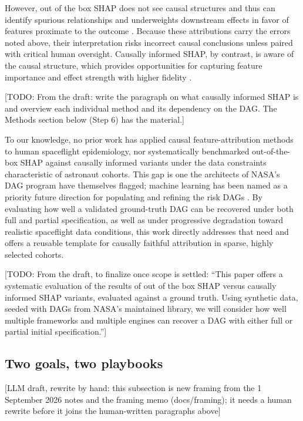 \documentclass[11pt]{article}
\newcommand{\todo}[1]{\textcolor{red!70!black}{[TODO: #1]}}
\newcommand{\draftnote}[1]{\textcolor{blue!60!black}{[LLM draft, rewrite by hand: #1]}}
\begin{document}
However, out of the box SHAP does not see causal structures and thus can
identify spurious relationships and underweights downstream effects in favor
of features proximate to the outcome
\citep{ACIC2026,Janzing2020,Aas2021,Kumar2020,Ng2025}. Because these
attributions carry the errors noted above, their interpretation risks
incorrect causal conclusions unless paired with critical human oversight.
Causally informed SHAP, by contrast, is aware of the causal structure, which
provides opportunities for capturing feature importance and effect strength
with higher fidelity \citep{Ng2025}.

\todo{From the draft: write the paragraph on what causally informed SHAP is
and overview each individual method and its dependency on the DAG. The
Methods section below (Step 6) has the material.}

To our knowledge, no prior work has applied causal feature-attribution
methods to human spaceflight epidemiology, nor systematically benchmarked
out-of-the-box SHAP against causally informed variants under the data
constraints characteristic of astronaut cohorts. This gap is one the
architects of NASA's DAG program have themselves flagged; machine learning
has been named as a priority future direction for populating and refining
the risk DAGs \citep{Reynolds2022,Sanders2023}. By evaluating how well a
validated ground-truth DAG can be recovered under both full and partial
specification, as well as under progressive degradation toward realistic
spaceflight data conditions, this work directly addresses that need and
offers a reusable template for causally faithful attribution in sparse,
highly selected cohorts.

\todo{From the draft, to finalize once scope is settled: ``This paper offers
a systematic evaluation of the results of out of the box SHAP versus
causally informed SHAP variants, evaluated against a ground truth. Using
synthetic data, seeded with DAGs from NASA's maintained library, we will
consider how well multiple frameworks and multiple engines can recover a DAG
with either full or partial initial specification.''}

\subsection*{Two goals, two playbooks}
\draftnote{this subsection is new framing from the 1 September 2026 notes
and the framing memo (docs/framing); it needs a human rewrite before it
joins the human-written paragraphs above}
\end{document}
